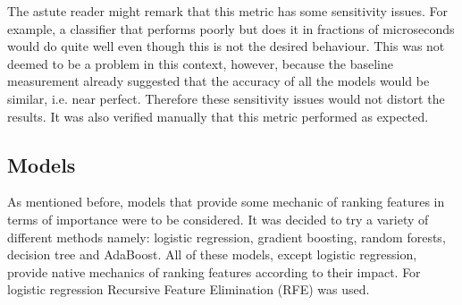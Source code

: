 \documentclass[british]{article}
\begin{document}
	The astute reader might remark that this metric has some sensitivity issues. For example, a classifier that performs poorly but does it in fractions of microseconds would do quite well even though this is not the desired behaviour. This was not deemed to be a problem in this context, however, because the baseline measurement already suggested that the accuracy of all the models would be similar, i.e. near perfect. Therefore these sensitivity issues would not distort the results. It was also verified manually that this metric performed as expected. 
	
	\subsection{Models} As mentioned before, models that provide some mechanic of ranking features in terms of importance were to be considered. It was decided to try a variety of different methods namely: logistic regression, gradient boosting, random forests, decision tree and AdaBoost. All of these models, except logistic regression, provide native mechanics of ranking features according to their impact. For logistic regression Recursive Feature Elimination (RFE) was used. 
	
	
\end{document}
